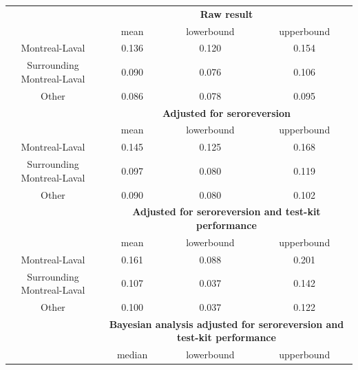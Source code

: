 \begin{table}[]
\centering
\label{tab:results}
\begin{tabular}{c|ccc}
                           & \multicolumn{3}{c}{\textbf{Raw result}}                                        \\
                           & mean                & lowerbound             & upperbound             \\
Montreal-Laval             & 0.136               & 0.120                  & 0.154                  \\
Surrounding Montreal-Laval & 0.090               & 0.076                  & 0.106                  \\
Other                      & 0.086               & 0.078                  & 0.095                  \\
\hline
                           & \multicolumn{3}{c}{\textbf{Adjusted for seroreversion}}                          \\
                           & mean                & lowerbound             & upperbound             \\
Montreal-Laval             & 0.145               & 0.125                  & 0.168                  \\
Surrounding Montreal-Laval & 0.097               & 0.080                  & 0.119                  \\
Other                      & 0.090               & 0.080                  & 0.102                  \\
\hline
                           & \multicolumn{3}{c}{\textbf{Adjusted for seroreversion and test-kit performance}} \\
                           & mean                & lowerbound             & upperbound             \\
Montreal-Laval             & 0.161               & 0.088                  & 0.201                  \\
Surrounding Montreal-Laval & 0.107               & 0.037                  & 0.142                  \\
Other                      & 0.100               & 0.037             & 0.122                  \\
\hline
                           & \multicolumn{3}{c}{\textbf{Bayesian analysis adjusted for seroreversion and test-kit performance}}                                 \\
                           & median              & lowerbound             & upperbound             \\

\end{tabular}
\end{table}
